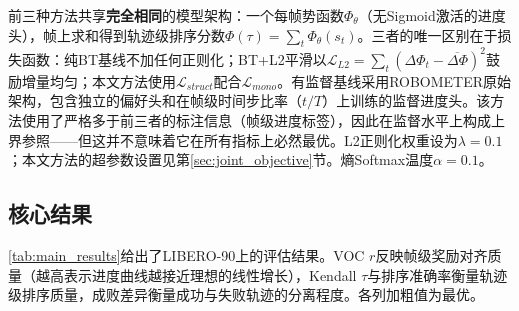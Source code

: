 \begin{table}[ht]
    \centering
    \caption{四种比较方法的配置。前三种仅使用成对偏好标签，有监督基线额外使用帧级进度标签，构成监督水平上的上界参照。}
    \label{tab:methods}
\end{table}

前三种方法共享\textbf{完全相同}的模型架构：一个每帧势函数$\Phi_\theta$（无Sigmoid激活的进度头），帧上求和得到轨迹级排序分数$\Phi(\tau) = \sum_{t} \Phi_\theta(s_t)$。三者的唯一区别在于损失函数：纯BT基线不加任何正则化；BT+L2平滑以$\mathcal{L}_{L2} = \sum_t (\Delta\Phi_t - \overline{\Delta\Phi})^2$鼓励增量均匀；本文方法使用$\mathcal{L}_{struct}$配合$\mathcal{L}_{mono}$。有监督基线采用ROBOMETER原始架构，包含独立的偏好头和在帧级时间步比率（$t/T$）上训练的监督进度头。该方法使用了严格多于前三者的标注信息（帧级进度标签），因此在监督水平上构成上界参照——但这并不意味着它在所有指标上必然最优。L2正则化权重设为$\lambda = 0.1$；本文方法的超参数设置见第\ref{sec:joint_objective}节。熵Softmax温度$\alpha = 0.1$。

\subsection{核心结果}

\cref{tab:main_results}给出了LIBERO-90上的评估结果。VOC $r$反映帧级奖励对齐质量（越高表示进度曲线越接近理想的线性增长），Kendall $\tau$与排序准确率衡量轨迹级排序质量，成败差异衡量成功与失败轨迹的分离程度。各列加粗值为最优。

